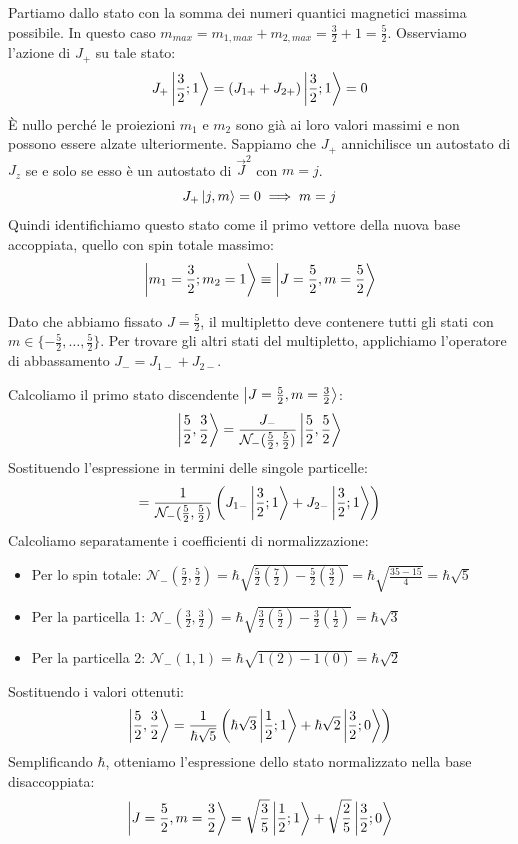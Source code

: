 Partiamo dallo stato con la somma dei numeri quantici magnetici massima possibile. In questo caso \( m_{max} = m_{1,max} + m_{2,max} = \frac{3}{2} + 1 = \frac{5}{2} \).
Osserviamo l'azione di \( J_+ \) su tale stato:
\[
    J_+ \ket{\frac{3}{2}; 1} = (J_{1+} + J_{2+}) \ket{\frac{3}{2}; 1} = 0
\]
È nullo perché le proiezioni \( m_1 \) e \( m_2 \) sono già ai loro valori massimi e non possono essere alzate ulteriormente.
Sappiamo che \( J_+ \) annichilisce un autostato di \( J_z \) se e solo se esso è un autostato di \( \vec{J}^2 \) con \( m=j \).
\begin{equation}
    J_+ \ket{j,m} = 0 \implies m=j
\end{equation}
Quindi identifichiamo questo stato come il primo vettore della nuova base accoppiata, quello con spin totale massimo:
\begin{equation}
    \ket{m_1=\frac{3}{2}; m_2=1} \equiv \ket{J=\frac{5}{2}, m=\frac{5}{2}}
\end{equation}

Dato che abbiamo fissato \( J=\frac{5}{2} \), il multipletto deve contenere tutti gli stati con \( m \in \{-\frac{5}{2}, \dots, \frac{5}{2}\} \).
Per trovare gli altri stati del multipletto, applichiamo l'operatore di abbassamento \( J_- = J_{1-} + J_{2-} \).

Calcoliamo il primo stato discendente \( \ket{J=\frac{5}{2}, m=\frac{3}{2}} \):
\[
    \ket{\frac{5}{2}, \frac{3}{2}} = \frac{J_-}{\mathcal{N}_-(\frac{5}{2}, \frac{5}{2})} \ket{\frac{5}{2}, \frac{5}{2}}
\]
Sostituendo l'espressione in termini delle singole particelle:
\[
    = \frac{1}{\mathcal{N}_-(\frac{5}{2}, \frac{5}{2})} \left( J_{1-}\ket{\frac{3}{2}; 1} + J_{2-}\ket{\frac{3}{2}; 1} \right)
\]
Calcoliamo separatamente i coefficienti di normalizzazione:
\begin{itemize}
    \item Per lo spin totale: \( \mathcal{N}_-(\frac{5}{2}, \frac{5}{2}) = \hbar\sqrt{\frac{5}{2}(\frac{7}{2}) - \frac{5}{2}(\frac{3}{2})} = \hbar\sqrt{\frac{35-15}{4}} = \hbar\sqrt{5} \)
    \item Per la particella 1: \( \mathcal{N}_-(\frac{3}{2}, \frac{3}{2}) = \hbar\sqrt{\frac{3}{2}(\frac{5}{2}) - \frac{3}{2}(\frac{1}{2})} = \hbar\sqrt{3} \)
    \item Per la particella 2: \( \mathcal{N}_-(1, 1) = \hbar\sqrt{1(2) - 1(0)} = \hbar\sqrt{2} \)
\end{itemize}

Sostituendo i valori ottenuti:
\[
    \ket{\frac{5}{2}, \frac{3}{2}} = \frac{1}{\hbar\sqrt{5}} \left( \hbar\sqrt{3}\ket{\frac{1}{2}; 1} + \hbar\sqrt{2}\ket{\frac{3}{2}; 0} \right)
\]
Semplificando \( \hbar \), otteniamo l'espressione dello stato normalizzato nella base disaccoppiata:
\begin{equation}
    \ket{J=\frac{5}{2}, m=\frac{3}{2}} = \sqrt{\frac{3}{5}} \ket{\frac{1}{2}; 1} + \sqrt{\frac{2}{5}} \ket{\frac{3}{2}; 0}
\end{equation}


